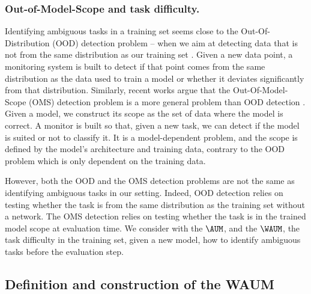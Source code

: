 \subsubsection{Out-of-Model-Scope and task difficulty.}
Identifying ambiguous tasks in a training set seems close to the Out-Of-Distribution (OOD) detection problem -- when we aim at detecting data that is not from the same distribution as our training set \citep{schorn2020facer,wang2022vim}.
Given a new data point, a monitoring system is built to detect if that point comes from the same distribution as the data used to train a model or whether it deviates significantly from that distribution.
Similarly, recent works argue that the Out-Of-Model-Scope (OMS) detection problem is a more general problem than OOD detection \citep{granese2021doctor,guerin2023out}.
Given a model, we construct its scope as the set of data where the model is correct.
A monitor is built so that, given a new task, we can detect if the model is suited or not to classify it.
It is a model-dependent problem, and the scope is defined by the model's architecture and training data, contrary to the OOD problem which is only dependent on the training data.

However, both the OOD and the OMS detection problems are not the same as identifying ambiguous tasks in our setting.
Indeed, OOD detection relies on testing whether the task is from the same distribution as the training set without a network.
The OMS detection relies on testing whether the task is in the trained model scope at evaluation time.
We consider with the $\AUM$, and the $\WAUM$, the task difficulty in the training set, given a new model, how to identify ambiguous tasks before the evaluation step.

\subsection{Definition and construction of the WAUM}
\label{sub:def_waum}

